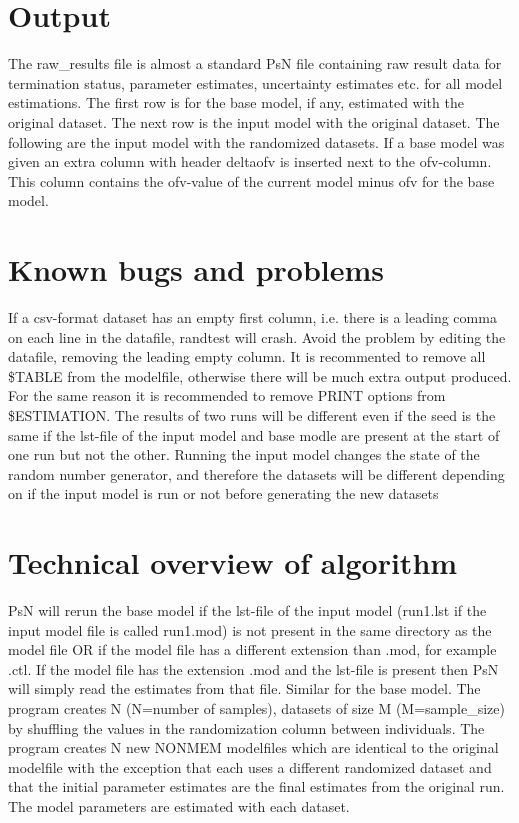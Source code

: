 \section{Output}

The raw\_results file is almost a standard PsN file containing raw result data for termination status, parameter estimates, uncertainty estimates etc. for all model estimations. The first row is for the base model, if any, estimated with the original dataset. The next row is the input model with the original dataset. The following are the input model with the randomized datasets. If a base model was given an extra column with header deltaofv is inserted next to the ofv-column. This column contains the ofv-value of the current model minus ofv for the base model.

\section{Known bugs and problems}

If a csv-format dataset has an empty first column, i.e. there is a leading comma on each line in the datafile, randtest will crash. Avoid the problem by editing the datafile, removing the leading empty column.
It is recommented to remove all \$TABLE from the modelfile, otherwise there will be much extra output produced. For the same reason it is recommended to remove PRINT options from \$ESTIMATION. 
The results of two runs will be different even if the seed is the same if the lst-file of the input model and base modle are present at the start of one run but not the other. Running the input model changes the state of the random number generator, and therefore the datasets will be different depending on if the input model is run or not before generating the  new datasets

\section{Technical overview of algorithm}

PsN will rerun the base model if the lst-file of the input model (run1.lst if the input model file is called run1.mod) is not present in the same directory as the model file OR if the model file has a different extension than .mod, for example .ctl. If the model file has the extension .mod and the lst-file is present then PsN will simply read the estimates from that file. Similar for the base model.
The program creates N (N=number of samples), datasets of size M (M=sample\_size) by shuffling the values in the randomization column between individuals. The program creates N new NONMEM modelfiles which are identical to the original modelfile with the exception that each uses a different randomized dataset and that the initial parameter estimates are the final estimates from the original run. The model parameters are estimated with each dataset.


